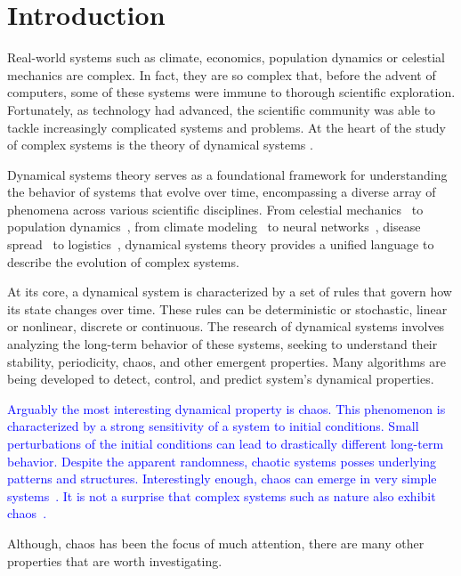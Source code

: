 \chapter{Introduction}
\label{sec:Introduction}

Real-world systems such as climate, economics, population dynamics or celestial mechanics are complex.
In fact, they are so complex that, before the advent of computers, some of these systems were immune to thorough scientific exploration.
Fortunately, as technology had advanced, the scientific community was able to tackle increasingly complicated systems and problems.
At the heart of the study of complex systems is the theory of dynamical systems \cite{Devaney20211026, Hirsch2013, Strogatz201854}.
\par
Dynamical systems theory serves as a foundational framework for understanding the behavior of systems that evolve over time, encompassing a diverse array of phenomena across various scientific disciplines.
From celestial mechanics~\cite{Holmes1990} to population dynamics~\cite{Hastings1993,Hadeler2001}, from climate modeling~\cite{Ghil2023} to neural networks~\cite{Cessac2009, Vogt2020, Li2019}, disease spread~\cite{Ritelli20210930} to logistics~\cite{Kumara2003}, dynamical systems theory provides a unified language to describe the evolution of complex systems.
\par
At its core, a dynamical system is characterized by a set of rules that govern how its state changes over time.
These rules can be deterministic or stochastic, linear or nonlinear, discrete or continuous.
The research of dynamical systems involves analyzing the long-term behavior of these systems, seeking to understand their stability, periodicity, chaos, and other emergent properties.
Many algorithms are being developed to detect, control, and predict system's dynamical properties.
\par
\textcolor{blue}{
Arguably the most interesting dynamical property is chaos.
This phenomenon is characterized by a strong sensitivity of a system to initial conditions.
Small perturbations of the initial conditions can lead to drastically different long-term behavior.
Despite the apparent randomness, chaotic systems posses underlying patterns and structures.
Interestingly enough, chaos can emerge in very simple systems~\cite{Lorenz2004,May19760610}.
It is not a surprise that complex systems such as nature also exhibit chaos~\cite{Toker2020}.
}
\par
Although, chaos has been the focus of much attention, there are many other properties that are worth investigating.
